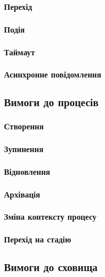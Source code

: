 \subsubsection{Перехід}

\subsubsection{Подія}

\subsubsection{Таймаут}

\subsubsection{Асинхронне повідомлення}

\subsection{Вимоги до процесів}

\subsubsection{Створення}

\subsubsection{Зупинення}

\subsubsection{Відновлення}

\subsubsection{Архівація}

\subsubsection{Зміна контексту процесу}

\subsubsection{Перехід на стадію}

\subsection{Вимоги до сховища}


